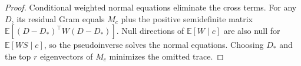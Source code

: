 \begin{proof}
Conditional weighted normal equations eliminate the cross terms. For
any $D$, its residual Gram equals $M_c$ plus the positive semidefinite
matrix
$\mathbb E[(D-D_*)^\top W(D-D_*)]$. Null directions of
$\mathbb E[W\mid c]$ are also null for $\mathbb E[WS\mid c]$, so the
pseudoinverse solves the normal equations. Choosing $D_*$ and the top
$r$ eigenvectors of $M_c$ minimizes the omitted trace.
\end{proof}
